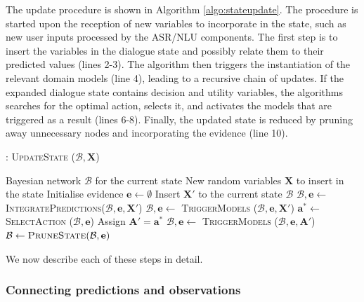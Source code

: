 The update procedure is shown in Algorithm \ref{algo:stateupdate}. The procedure is started upon the reception of new variables to incorporate in the state, such as new user inputs processed by the ASR/NLU components. The first step is to insert the variables in the dialogue state and possibly relate them to their predicted values (lines 2-3). The algorithm then triggers the instantiation of the relevant domain models (line 4), leading to a recursive chain of updates.  If the expanded dialogue state contains decision and utility variables, the algorithms searches for the optimal action, selects it, and activates the models that are triggered as a result  (lines 6-8). Finally, the updated state is reduced by pruning away unnecessary nodes and incorporating the evidence (line 10). 


\begin{algorithm}[h]
\caption{: \textsc{UpdateState} ($\mathcal{B}, \mathbf{X}$)}
\begin{algorithmic}[1] \vspace{1mm}
\REQUIRE Bayesian network $\mathcal{B}$ for the current state
\REQUIRE New random variables $\mathbf{X}$ to insert in the state \vspace{1mm}
\STATE Initialise evidence $\mathbf{e} \leftarrow \emptyset$
\STATE Insert $\mathbf{X}'$ to the current state $\mathcal{B}$ 
\STATE $\mathcal{B}, \mathbf{e} \leftarrow $ \textsc{IntegratePredictions}($\mathcal{B}, \mathbf{e}, \mathbf{X}'$)
\STATE $\mathcal{B}, \mathbf{e} \leftarrow$ \textsc{TriggerModels} ($\mathcal{B}, \mathbf{e},  \mathbf{X}'$) \vspace{1mm}
\STATE $\mathbf{a}^* \leftarrow $ \textsc{SelectAction} ($\mathcal{B}, \mathbf{e}$)
\STATE Assign $\mathbf{A}' = \mathbf{a}^*$
\STATE $\mathcal{B}, \mathbf{e} \leftarrow$ \textsc{TriggerModels} ($\mathcal{B}, \mathbf{e}, \mathbf{A}'$)
\ENDWHILE \vspace{1mm}
\STATE $\mathcal{B} \leftarrow \textsc{PruneState} (\mathcal{B}, \mathbf{e})$ \vspace{1mm}
\end{algorithmic}
\label{algo:stateupdate}
\end{algorithm}

We now describe each of these steps in detail.


\subsubsection*{Connecting predictions and observations}

